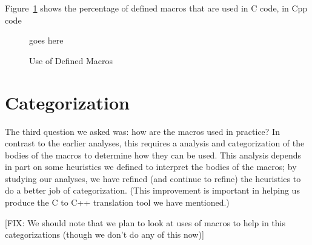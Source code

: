 Figure~\ref{fig:define_usage} shows the percentage of defined macros
that are used in C code, in Cpp code

\begin{figure}
goes here

\caption{Use of Defined Macros\label{fig:define_usage}}
\end{figure}


\section{Categorization}\label{sec:categorization}

The third question we asked was: how are the macros used in practice?
In contrast to the earlier analyses, this requires a analysis and
categorization of the bodies of the macros to determine how they can
be used.  This analysis depends in part on some heuristics we defined
to interpret the bodies of the macros; by studying our analyses, we
have refined (and continue to refine) the heuristics to do a better
job of categorization.  (This improvement is important in helping us
produce the C to C++ translation tool we have mentioned.)

[FIX: We should note that we plan to look at uses of macros to help in
this categorizations (though we don't do any of this now)]

